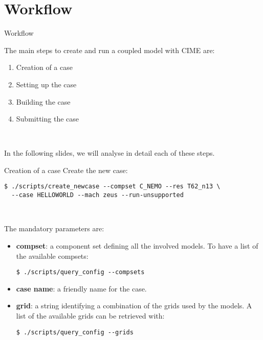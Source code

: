\section{Workflow}

\begin{frame}{Workflow}

The main steps to create and run a coupled model with CIME are:

\begin{enumerate}
    \item Creation of a case    
    \item Setting up the case
    \item Building the case
    \item Submitting the case
\end{enumerate}    

\ 

In the following slides, we will analyse in detail each of these steps.

\end{frame}



\begin{frame}[fragile]{Creation of a case}
Create the new case:

\begin{verbatim}
$ ./scripts/create_newcase --compset C_NEMO --res T62_n13 \ 
  --case HELLOWORLD --mach zeus --run-unsupported
\end{verbatim}

\ 

The mandatory parameters are:

\begin{itemize}
    \item<1-> \textbf{compset}: a component set defining all the involved models. To have a list of the available compsets:
    \begin{verbatim}
$ ./scripts/query_config --compsets
    \end{verbatim}
    \item<2-> \textbf{case name}: a friendly name for the case. 
    
    \item<3-> \textbf{grid}: a string identifying a combination of the grids used by the models. A list of the available grids can be retrieved with: 
    \begin{verbatim}
$ ./scripts/query_config --grids
    \end{verbatim}
\end{itemize}
\end{frame}

